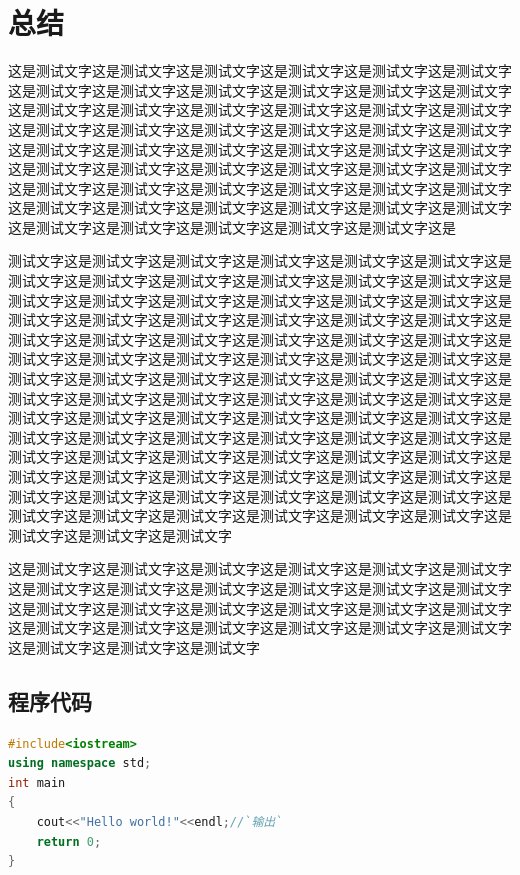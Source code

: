 \documentclass[UTF8]{ctexart}
\begin{document}
\section{总结}
\par 这是测试文字这是测试文字这是测试文字这是测试文字这是测试文字这是测试文字这是测试文字这是测试文字这是测试文字这是测试文字这是测试文字这是测试文字这是测试文字这是测试文字这是测试文字这是测试文字这是测试文字这是测试文字这是测试文字这是测试文字这是测试文字这是测试文字这是测试文字这是测试文字这是测试文字这是测试文字这是测试文字这是测试文字这是测试文字这是测试文字这是测试文字这是测试文字这是测试文字这是测试文字这是测试文字这是测试文字这是测试文字这是测试文字这是测试文字这是测试文字这是测试文字这是测试文字这是测试文字这是测试文字这是测试文字这是测试文字这是测试文字这是测试文字这是测试文字这是测试文字这是测试文字这是测试文字这是测试文字这是
\par 测试文字这是测试文字这是测试文字这是测试文字这是测试文字这是测试文字这是测试文字这是测试文字这是测试文字这是测试文字这是测试文字这是测试文字这是测试文字这是测试文字这是测试文字这是测试文字这是测试文字这是测试文字这是测试文字这是测试文字这是测试文字这是测试文字这是测试文字这是测试文字这是测试文字这是测试文字这是测试文字这是测试文字这是测试文字这是测试文字这是测试文字这是测试文字这是测试文字这是测试文字这是测试文字这是测试文字这是测试文字这是测试文字这是测试文字这是测试文字这是测试文字这是测试文字这是测试文字这是测试文字这是测试文字这是测试文字这是测试文字这是测试文字这是测试文字这是测试文字这是测试文字这是测试文字这是测试文字这是测试文字这是测试文字这是测试文字这是测试文字这是测试文字这是测试文字这是测试文字这是测试文字这是测试文字这是测试文字这是测试文字这是测试文字这是测试文字这是测试文字这是测试文字这是测试文字这是测试文字这是测试文字这是测试文字这是测试文字这是测试文字这是测试文字这是测试文字这是测试文字这是测试文字这是测试文字这是测试文字这是测试文字这是测试文字这是测试文字这是测试文字这是测试文字这是测试文字这是测试文字
\par 这是测试文字这是测试文字这是测试文字这是测试文字这是测试文字这是测试文字这是测试文字这是测试文字这是测试文字这是测试文字这是测试文字这是测试文字这是测试文字这是测试文字这是测试文字这是测试文字这是测试文字这是测试文字这是测试文字这是测试文字这是测试文字这是测试文字这是测试文字这是测试文字这是测试文字这是测试文字这是测试文字
\newpage
\begin{appendices}
\section{程序代码}
\begin{lstlisting}[language=C++,escapeinside=``]
#include<iostream>
using namespace std;
int main
{
	cout<<"Hello world!"<<endl;//`输出`
	return 0;
}
\end{lstlisting}
\end{appendices}
	
\end{document}

